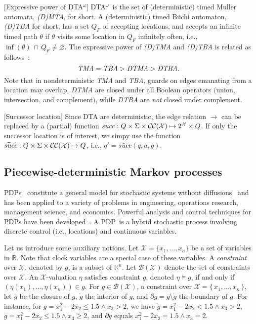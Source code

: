 \documentclass{LMCS}
\renewcommand{\emptyset}{\varnothing}
\newcommand{\mc}[1]{\mathcal{#1}}
\newcommand{\<}{\langle}
\renewcommand{\>}{\rangle}
\newcommand{\les}{\leqslant}
\newcommand{\mX}{\mathcal{X}}
\newcommand{\mB}{\mathcal{B}}
\newcommand{\DTA}{\textsc{DTA}}
\newcommand{\DTAo}{\DTA$^{\omega}$}
\newcommand{\PDP}{\textsc{PDP}}
\newcommand{\Reals}{\mathbb{R}}
\begin{document}
\begin{rem}$[$Expressive power of \DTAo$]$
\DTAo \ is the set of (deterministic) timed Muller automata, \emph{(D)MTA}, for short.
A (deterministic) timed B\"uchi automaton, \emph{(D)TBA} for short, has a set $Q_F$ of
accepting locations, and accepts an infinite timed path $\theta$ if $\theta$ visits
some location in $Q_F$ infinitely often, i.e., $\inf(\theta) \, \cap \, Q_F\neq\emptyset$.
The expressive power of \emph{(D)TMA} and \emph{(D)TBA} is related as follows~\cite{AD94}:
\[ \emph{TMA} = \emph{TBA} > \emph{DTMA} > \emph{DTBA}.\]
Note that in nondeterministic \emph{TMA} and \emph{TBA}, guards on edges emanating from a
location may overlap.
\emph{DTMA} are closed under all Boolean operators $($union, intersection,
and complement$)$, while \emph{DTBA} are \emph{not} closed under complement.
\end{rem}

\begin{rem}$[$Successor location$]$
Since DTA are deterministic, the edge relation $\rightarrow$ can be replaced
by a (partial) function $succ: Q\times \Sigma\times \mCC(\mc{X}) \mapsto 2^{\mc{X}}
\times Q$.
If only the successor location is of interest, we simpy use the function
$\widetilde{succ}: Q \times \Sigma \times \mCC(\mc{X}) \mapsto Q$, i.e., $q' =
\widetilde{succ}(q,a,g)$.
\end{rem}

\subsection{Piecewise-deterministic Markov processes}\label{sec:PDP}

PDPs~\cite{Dav84} constitute a general model for stochastic systems without
diffusions~\cite{Dav93} and has been applied to a variety of problems in
engineering, operations research, management science, and economics.
Powerful analysis and control techniques for PDPs have been developed~\cite{Len85,Len91,Cos88}.
A \PDP\ is a hybrid stochastic process involving discrete control (i.e.,
locations) and continuous variables.

Let us introduce some auxiliary notions.
Let $\mX = \{x_1, \ldots, x_n\}$ be a set of variables in $\Reals$.
Note that clock variables are a special case of these variables.
A \emph{constraint} over $\mX$, denoted by $g$, is a subset of $\Reals^n$.
Let $\mB(\mX)$ denote the set of constraints over $\mX$.
An $\mX$-valuation $\eta$ satisfies constraint $g$, denoted $\eta \models
g$, if and only if $(\eta(x_1),...,\eta(x_n)) \in g$.
For $g \in \mc{B}(\mc{X})$, a constraint over $\mc{X} = \{ \, x_1, \ldots, x_n
\, \}$, let $\overline{g}$ be the closure of $g$, $\mathring{g}$ the interior
of $g$, and $\partial g = \overline{g} \setminus \mathring{g}$ the boundary
of $g$.
For instance, for $g = {x_1^2 - 2x_2 \les 1.5} \wedge {x_3> 2}$, we have
$\mathring{g} = {x_1^2-2x_2< 1.5 \wedge x_3>2}$, $\overline{g} = x_1^2
- 2x_2 \leqslant 1.5 \wedge x_3 \geqslant2$, and $\partial g$ equals $x_1^2
- 2x_2 = 1.5\wedge x_3 = 2$.
\end{document}
